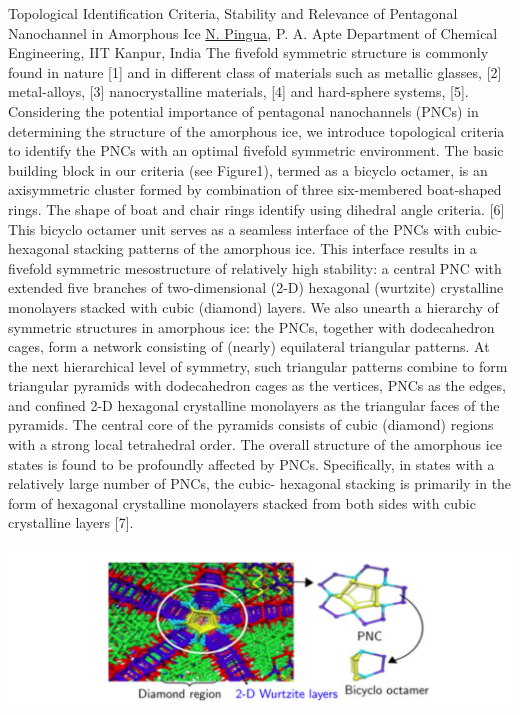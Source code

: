 
    \begin{abstract_online}{Topological Identification Criteria, Stability and Relevance of Pentagonal Nanochannel in Amorphous Ice }{%
        \underline{N. Pingua}, P. A. Apte}{%
        }{%
        Department of Chemical Engineering, IIT Kanpur, India}
    The fivefold symmetric structure is commonly found in nature [1] and in different class of materials such as metallic glasses, [2] metal-alloys, [3] nanocrystalline materials, [4] and hard-sphere systems, [5]. Considering the potential importance of pentagonal nanochannels (PNCs) in determining the structure of the amorphous ice, we introduce topological criteria to identify the PNCs with an optimal fivefold symmetric environment. The basic building block in our criteria (see Figure1), termed as a bicyclo octamer, is an axisymmetric cluster formed by combination of three six-membered boat-shaped rings. The shape of boat and chair rings identify using dihedral angle criteria. [6] This bicyclo octamer unit serves as a seamless interface of the PNCs with cubic-hexagonal stacking patterns of the amorphous ice. This interface results in a fivefold symmetric mesostructure of relatively high stability: a central PNC with extended five branches of two-dimensional (2-D) hexagonal (wurtzite) crystalline monolayers stacked with cubic (diamond) layers. We also unearth a hierarchy of symmetric structures in amorphous ice: the PNCs, together with dodecahedron cages, form a network consisting of (nearly) equilateral triangular patterns. At the next hierarchical level of symmetry, such triangular patterns combine to form triangular pyramids with dodecahedron cages as the vertices, PNCs as the edges, and confined 2-D hexagonal crystalline monolayers as the triangular faces of the pyramids. The central core of the pyramids consists of cubic (diamond) regions with a strong local tetrahedral order. The overall structure of the amorphous ice states is found to be profoundly affected by PNCs. Specifically, in states with a relatively large number of PNCs, the cubic- hexagonal stacking is primarily in the form of hexagonal crystalline monolayers stacked from both sides with cubic crystalline layers [7]. \begin{center}  \includegraphics[width=\linewidth]{abstracts/txt/figures/nandlal.png}  \caption{\textbf{Figure 1:} Basic building block to identify the pentagonal nanochannel (PNC).}  \end{center} 
    

\end{abstract_online}
